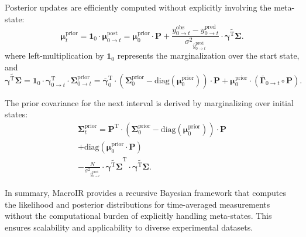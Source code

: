 \documentclass[pdflatex,sn-mathphys-num]{sn-jnl}%
\theoremstyle{thmstyleone}%
\theoremstyle{thmstyletwo}%
\theoremstyle{thmstylethree}%
\begin{document}
Posterior updates are efficiently computed without explicitly involving the meta-state:
\begin{equation}
	\boldsymbol{\mu}^{\mathrm{prior}}_{t} = 
	\boldsymbol{1}_0 \cdot 
	\boldsymbol{\mu}^{\mathrm{post}}_{0 \rightarrow t} = \boldsymbol{\mu}^{\mathrm{prior}}_0 \cdot \boldsymbol{P} + 
	\frac{y^{\mathrm{obs}}_{0 \rightarrow t} - y^{\mathrm{pred}}_{0 \rightarrow t}}{{\sigma^2}_{\overline{y}^{\mathrm{pred}}_{0 \rightarrow t}}} 
	\cdot \widetilde{\boldsymbol{\gamma}^{\mathrm{T}} \boldsymbol{\Sigma}}.
	\label{eq:macro_interval_posterior_mean}
\end{equation}
where left-multiplication by \( \mathbf{1}_0 \) represents the marginalization over the start state, and
\begin{equation}
	\widetilde{\boldsymbol{\gamma}^{\mathrm{T}} \boldsymbol{\Sigma}} = \mathbf{1}_0 \cdot \mathbf{\gamma}^{\mathrm{T}}_{0 \rightarrow t} \cdot \mathbf{\Sigma}^{\mathrm{prior}}_{0 \rightarrow t} =
	\overline{\boldsymbol{\gamma}}_{0}^{\mathrm{T}} \cdot 
	\left( \boldsymbol{\Sigma}^{\mathrm{prior}}_{0} - \mathrm{diag}(\boldsymbol{\mu}^{\mathrm{prior}}_0) \right) \cdot \boldsymbol{P} 
	+ \boldsymbol{\mu}^{\mathrm{prior}}_0 \cdot \left( \overline{\boldsymbol{\Gamma}}_{0 \rightarrow t} \circ \boldsymbol{P} \right).
	\label{eq:interval_gamma_sigma}
\end{equation}

The prior covariance for the next interval is derived by marginalizing over initial states:
\begin{multline}
	\boldsymbol{\Sigma}^{\mathrm{prior}}_{t} = 
	\boldsymbol{P}^{\mathrm{T}} \cdot \left( \boldsymbol{\Sigma}^{\mathrm{prior}}_{0} - \mathrm{diag}(\boldsymbol{\mu}^{\mathrm{prior}}_{0}) \right) \cdot \boldsymbol{P} \\
	+ \mathrm{diag}(\boldsymbol{\mu}^{\mathrm{prior}}_{0} \cdot \boldsymbol{P}) \\
	- \frac{N}{{\sigma^2}_{\overline{y}^{\mathrm{pred}}_{0 \rightarrow t}}} \cdot
	\widetilde{\boldsymbol{\gamma}^{\mathrm{T}} \boldsymbol{\Sigma}}^{\mathrm{T}} \cdot \widetilde{\boldsymbol{\gamma}^{\mathrm{T}} \boldsymbol{\Sigma}}.
	\label{eq:prior_covariance_update_0_t}
\end{multline}

In summary, MacroIR provides a recursive Bayesian framework that computes the likelihood and posterior distributions for time-averaged measurements without the computational burden of explicitly handling meta-states. This ensures scalability and applicability to diverse experimental datasets.
\end{document}
